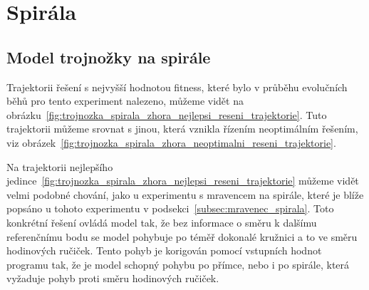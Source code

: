 
\clearpage

\section{Spirála}
\subsection{Model trojnožky na spirále}

Trajektorii řešení s nejvyšší hodnotou fitness, které bylo v průběhu evolučních běhů pro tento experiment nalezeno, můžeme vidět na obrázku~\ref{fig:trojnozka_spirala_zhora_nejlepsi_reseni_trajektorie}.
Tuto trajektorii můžeme srovnat s jinou, která vznikla řízením neoptimálním řešením, viz obrázek~\ref{fig:trojnozka_spirala_zhora_neoptimalni_reseni_trajektorie}.

Na trajektorii nejlepšího jedince~\ref{fig:trojnozka_spirala_zhora_nejlepsi_reseni_trajektorie} můžeme vidět velmi podobné chování, jako u experimentu s mravencem na spirále, které je blíže popsáno u tohoto experimentu v podsekci~\ref{subsec:mravenec_spirala}.
Toto konkrétní řešení ovládá model tak, že bez informace o směru k dalšímu referenčnímu bodu se model pohybuje po téměř dokonalé kružnici a to ve směru hodinových ručiček.
Tento pohyb je korigován pomocí vstupních hodnot programu tak, že je model schopný pohybu po přímce, nebo i po spirále, která vyžaduje pohyb proti směru hodinových ručiček.

